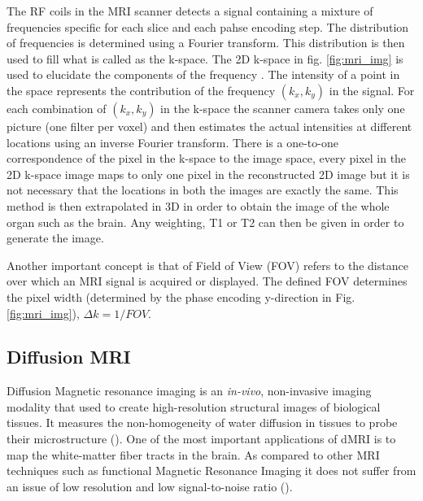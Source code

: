 \documentclass[msthesis.tex]{subfiles}
\begin{document}
The RF coils in the MRI scanner detects a signal containing a mixture of frequencies specific for each slice and each pahse encoding step. The distribution of frequencies is determined using a Fourier transform. This distribution is then used to fill what is called as the k-space. The 2D k-space in fig. \ref{fig:mri_img} is used to elucidate the components of the frequency . The intensity of a point in the space represents the contribution of the frequency $(k_x,k_y)$ in the signal. For each combination of $(k_x, k_y)$ in the k-space the scanner camera takes only one picture (one filter per voxel) and then estimates the actual intensities at different locations using an inverse Fourier transform. There is a one-to-one correspondence of the pixel in the k-space to the image space, every pixel in the 2D k-space image maps to only one pixel in the reconstructed 2D image but it is not necessary that the locations in both the images are exactly the same. This method is then extrapolated in 3D in order to obtain the image of the whole organ such as the brain. Any weighting, T1 or T2 can then be given in order to generate the image.

Another important concept is that of Field of View (FOV) refers to the distance over which an MRI signal is acquired or displayed. The defined FOV determines the pixel width (determined by the phase encoding y-direction in Fig. \ref{fig:mri_img}), $\Delta k = 1/FOV$. 



\subsection{Diffusion MRI}
Diffusion Magnetic resonance imaging is an \textit{in-vivo}, non-invasive imaging modality that used to create high-resolution structural images of biological tissues. It measures the non-homogeneity of water diffusion in tissues to probe their microstructure (\cite{ghosh2015survey}). One of the most important applications of dMRI is to map the white-matter fiber tracts in the brain. As compared to other MRI techniques such as functional Magnetic Resonance Imaging it does not suffer from an issue of low resolution and low signal-to-noise ratio (\cite{wong2016}). 
\end{document}
